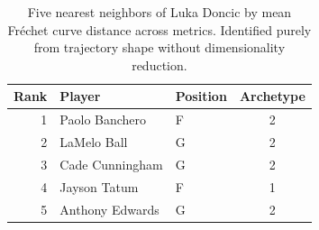 \begin{table}[htbp]
  \centering\small
  \begin{tabular}{rllc}
    \toprule
    Rank & Player & Position & Archetype \\
    \midrule
    1 & Paolo Banchero & F & 2 \\
    2 & LaMelo Ball & G & 2 \\
    3 & Cade Cunningham & G & 2 \\
    4 & Jayson Tatum & F & 1 \\
    5 & Anthony Edwards & G & 2 \\
    \bottomrule
  \end{tabular}
  \caption{Five nearest neighbors of Luka Doncic by mean Fr\'{e}chet curve distance across metrics. Identified purely from trajectory shape without dimensionality reduction.}
  \label{tab:Luka_Doncic_frechet_curve_neighbors}
\end{table}

